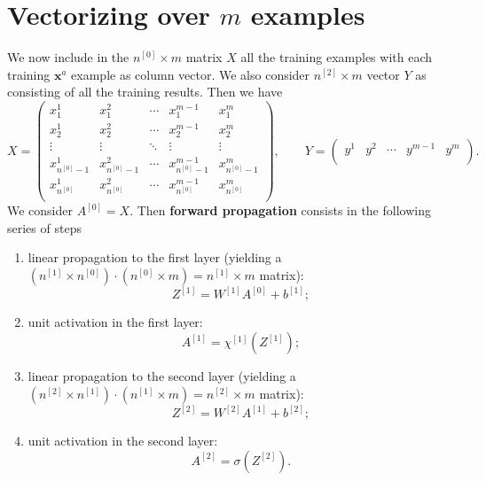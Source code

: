 \documentclass[aps,10pt]{revtex4}
\theoremstyle{plain}
\theoremstyle{definition}
\theoremstyle{remark}
\begin{document}
\section{Vectorizing over $m$ examples}
\noindent We now include in the $n^{[0]}\times m$ matrix $X$ all the training examples with each training $\mathbf{x}^a$ example as column vector. We also consider $n^{[2]}\times m$ vector $Y$ as consisting of all the training results. Then we have
\begin{equation}
X = \begin{pmatrix}
 x^1_1 & x^2_1 & \cdots & x^{m-1}_1 & x^m_1 \\
 x^1_2 & x^2_2 & \cdots & x^{m-1}_2 & x^m_2 \\
 \vdots & \vdots & \ddots & \vdots & \vdots \\
 x^1_{n^{[0]}-1} & x^2_{n^{[0]}-1} & \cdots & x^{m-1}_{n^{[0]}-1} & x^m_{n^{[0]}-1} \\
 x^1_{n^{[0]}} & x^2_{n^{[0]}} & \cdots & x^{m-1}_{n^{[0]}} & x^m_{n^{[0]}} \\
\end{pmatrix}, \qquad 
Y = \begin{pmatrix}
y^1 & y^2 & \cdots & y^{m-1} & y^m \\
\end{pmatrix}.
\end{equation}
We consider $A^{[0]} = X$. Then \textbf{forward propagation} consists in the following series of steps
\begin{enumerate}
	\item linear propagation to the first layer (yielding a $(n^{[1]}\times n^{[0]})\cdot(n^{[0]}\times m) = n^{[1]}\times m$ matrix):
	\begin{equation}
	Z^{[1]} = W^{[1]}A^{[0]} + b^{[1]};
	\end{equation}
	\item unit activation in the first layer:
	\begin{equation}
	 A^{[1]} = \chi^{[1]}\left(Z^{[1]}\right);
	\end{equation}
	\item linear propagation to the second layer (yielding a $(n^{[2]}\times n^{[1]})\cdot(n^{[1]}\times m) = n^{[2]}\times m$ matrix):
	\begin{equation}
	Z^{[2]} = W^{[2]}A^{[1]} + b^{[2]};
	\end{equation}
	\item unit activation in the second layer:
	\begin{equation}
	A^{[2]} = \sigma\left(Z^{[2]}\right).
	\end{equation}
\end{enumerate}
\end{document}
